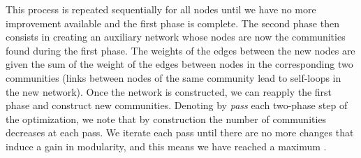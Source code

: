 This process is repeated sequentially for all nodes until we have no more improvement available and the first phase is complete.
The second phase then consists in creating an auxiliary network whose nodes are now the communities found during the first phase. The weights of the edges between the new nodes are given the sum of the weight of the edges between nodes in the corresponding two communities (links between nodes of the same community lead to self-loops in the new network). Once the network is constructed, we can reapply the first phase and construct new communities. Denoting by \textit{pass} each two-phase step of the optimization, we note that by construction the number of communities decreases at each pass. We iterate each pass until there are no more changes that induce a gain in modularity, and this means we have reached a maximum \cite{blondel2008louvain}.


